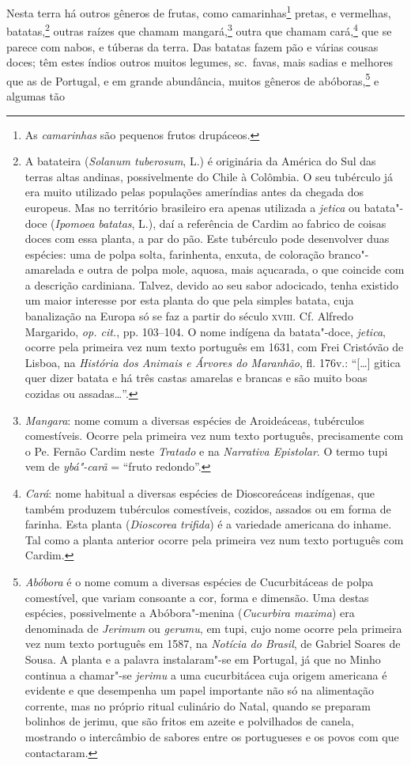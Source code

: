  Nesta terra há outros gêneros de frutas, como camarinhas\footnote{ As
\textit{camarinhas} são pequenos frutos drupáceos.} pretas, e
vermelhas, batatas,\footnote{ A batateira (\textit{Solanum tuberosum}, L.) 
é originária da América do Sul das terras altas andinas,
possivelmente do Chile à Colômbia. O seu tubérculo já era muito
utilizado pelas populações ameríndias antes da chegada dos europeus.
Mas no território brasileiro era apenas utilizada a \textit{jetica}
ou batata"-doce (\textit{Ipomoea batatas}, L.), daí a referência de
Cardim ao fabrico de coisas doces com essa planta, a par do pão. Este
tubérculo pode desenvolver duas espécies: uma de polpa solta,
farinhenta, enxuta, de coloração branco"-amarelada e outra de polpa
mole, aquosa, mais açucarada, o que coincide com a descrição
cardiniana. Talvez, devido ao seu sabor adocicado, tenha existido um
maior interesse por esta planta do que pela simples batata, cuja
banalização na Europa só se faz a partir do século \textsc{xviii}. Cf. Alfredo
Margarido, \textit{op. cit.}, pp. 103--104. O nome indígena da
batata"-doce, \textit{jetica}, ocorre pela primeira vez num texto
português em 1631, com Frei Cristóvão de Lisboa, na \textit{História
dos Animais e Árvores do Maranhão}, fl. 176v.: ``[\ldots{}] gitica quer dizer
batata e há três castas amarelas e brancas e são muito boas cozidas ou
assadas\ldots{}''.} outras raízes que chamam mangará,\footnote{ \textit{Mangara}: 
nome comum a diversas espécies de Aroideáceas,
tubérculos comestíveis. Ocorre pela primeira vez num texto português,
precisamente com o Pe. Fernão Cardim neste \textit{Tratado} e na
\textit{Narrativa Epistolar}. O termo tupi vem de \textit{ybá"-carã} = 
``fruto redondo''.} outra que chamam cará,\footnote{ \textit{Cará}: nome
habitual a diversas espécies de Dioscoreáceas indígenas, que também
produzem tubérculos comestíveis, cozidos, assados ou em forma de
farinha. Esta planta (\textit{Dioscorea trifida}) é a variedade
americana do inhame. Tal como a planta anterior ocorre pela primeira
vez num texto português com Cardim.} que se parece com nabos, e túberas
da terra. Das batatas fazem pão e várias cousas doces; têm estes índios
outros muitos legumes, sc.~favas, mais sadias e melhores que as de
Portugal, e em grande abundância, muitos gêneros de 
abóboras,\footnote{ \textit{Abóbora} é o nome comum a diversas espécies de
Cucurbitáceas de polpa comestível, que variam consoante a cor, forma e
dimensão. Uma destas espécies, possivelmente a Abóbora"-menina
(\textit{Cucurbira maxima}) era denominada de \textit{Jerimum}
ou \textit{gerumu}, em tupi, cujo nome ocorre pela primeira vez num
texto português em 1587, na \textit{Notícia do Brasil}, de Gabriel
Soares de Sousa. A planta e a palavra instalaram"-se em Portugal, já que
no Minho continua a chamar"-se \textit{jerimu} a uma cucurbitácea cuja
origem americana é evidente e que desempenha um papel importante não só
na alimentação corrente, mas no próprio ritual culinário do Natal,
quando se preparam bolinhos de jerimu, que são fritos em azeite e
polvilhados de canela, mostrando o intercâmbio de sabores entre os
portugueses e os povos com que contactaram.} e algumas tão
